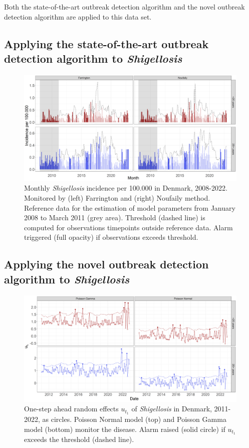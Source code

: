 \documentclass[a4paper,twoside,11pt]{report} %
\theoremstyle{definition}
\theoremstyle{definition}
\theoremstyle{definition}
\theoremstyle{definition}
\theoremstyle{remark}
\begin{document}
Both the state-of-the-art outbreak detection algorithm and the novel outbreak detection algorithm are applied to this data set.

\subsection{Applying the state-of-the-art outbreak detection algorithm to \textit{Shigellosis}}



\begin{figure}[H]
\includegraphics[width=1\linewidth]{../figures/Compare_stateOfTheArt_SHIG} \caption{Monthly \textit{Shigellosis} incidence per 100.000 in Denmark, 2008-2022. Monitored by (left) Farrington and (right) Noufaily method. Reference data for the estimation of model parameters from January 2008 to March 2011 (grey area). Threshold (dashed line) is computed for observations timepoints outside reference data. Alarm triggered (full opacity) if observations exceeds threshold.}\label{fig:CompareStateOfTheArtSHIG}
\end{figure}

\subsection{Applying the novel outbreak detection algorithm to \textit{Shigellosis}}



\begin{figure}[H]
\includegraphics[width=1\linewidth]{../figures/Compare_novel_SHIG} \caption{One-step ahead random effects \(u_{t_1}\) of \textit{Shigellosis} in Denmark, 2011-2022, as circles. Poisson Normal model (top) and Poisson Gamma model (bottom) monitor the disease. Alarm raised (solid circle) if \(u_{t_1}\) exceeds the threshold (dashed line).}\label{fig:CompareNovelSHIG}
\end{figure}
\end{document}
